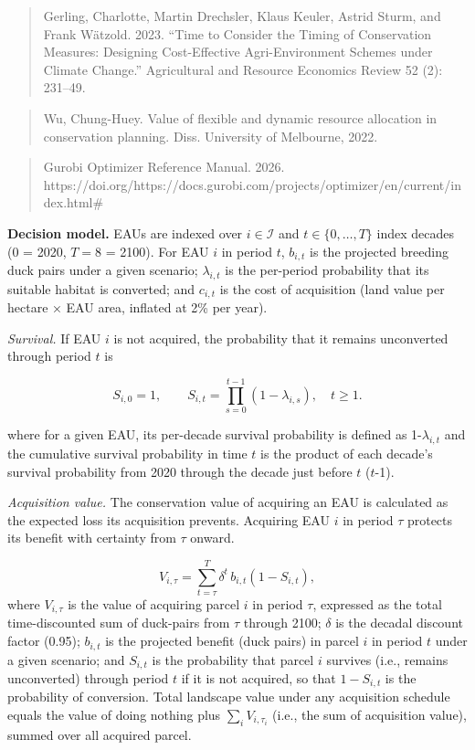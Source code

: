 \documentclass[
  letterpaper,
  DIV=11,
  numbers=noendperiod]{scrartcl}
\begin{document}
\begin{quote}
Gerling, Charlotte, Martin Drechsler, Klaus Keuler, Astrid Sturm, and
Frank Wätzold. 2023. ``Time to Consider the Timing of Conservation
Measures: Designing Cost-Effective Agri-Environment Schemes under
Climate Change.'' Agricultural and Resource Economics Review 52 (2):
231--49.
\end{quote}

\begin{quote}
Wu, Chung-Huey. Value of flexible and dynamic resource allocation in
conservation planning. Diss. University of Melbourne, 2022.
\end{quote}

\begin{quote}
Gurobi Optimizer Reference Manual. 2026.
https://doi.org/https://docs.gurobi.com/projects/optimizer/en/current/index.html\#
\end{quote}

\textbf{Decision model.} EAUs are indexed over \(i \in \mathcal{I}\) and
\(t \in \{0, \dots, T\}\) index decades (0 = 2020, \(T = 8\) = 2100).
For EAU \(i\) in period \(t\), \(b_{i,t}\) is the projected breeding
duck pairs under a given scenario; \(\lambda_{i,t}\) is the per-period
probability that its suitable habitat is converted; and \(c_{i,t}\) is
the cost of acquisition (land value per hectare × EAU area, inflated at
2\% per year).

\emph{Survival.} If EAU \(i\) is not acquired, the probability that it
remains unconverted through period \(t\) is

\[S_{i,0} = 1, \qquad S_{i,t} = \prod_{s=0}^{t-1} \left(1 - \lambda_{i,s}\right), \quad t \ge 1.\]

where for a given EAU, its per-decade survival probability is defined as
1-\(\lambda_{i,t}\) and the cumulative survival probability in time
\(t\) is the product of each decade's survival probability from 2020
through the decade just before \(t\) (\(t\)-1).

\emph{Acquisition value.} The conservation value of acquiring an EAU is
calculated as the expected loss its acquisition prevents. Acquiring EAU
\(i\) in period \(\tau\) protects its benefit with certainty from
\(\tau\) onward.

\[V_{i,\tau} = \sum_{t=\tau}^{T} \delta^{t}\, b_{i,t} \left(1 - S_{i,t}\right),\]
where \(V_{i,\tau}\) is the value of acquiring parcel \(i\) in period
\(\tau\), expressed as the total time-discounted sum of duck-pairs from
\(\tau\) through 2100; \(\delta\) is the decadal discount factor (0.95);
\(b_{i,t}\) is the projected benefit (duck pairs) in parcel \(i\) in
period \(t\) under a given scenario; and \(S_{i,t}\) is the probability
that parcel \(i\) survives (i.e., remains unconverted) through period
\(t\) if it is not acquired, so that \(1 - S_{i,t}\) is the probability
of conversion. Total landscape value under any acquisition schedule
equals the value of doing nothing plus \(\sum_i V_{i,\tau_i}\) (i.e.,
the sum of acquisition value), summed over all acquired parcel.
\end{document}
